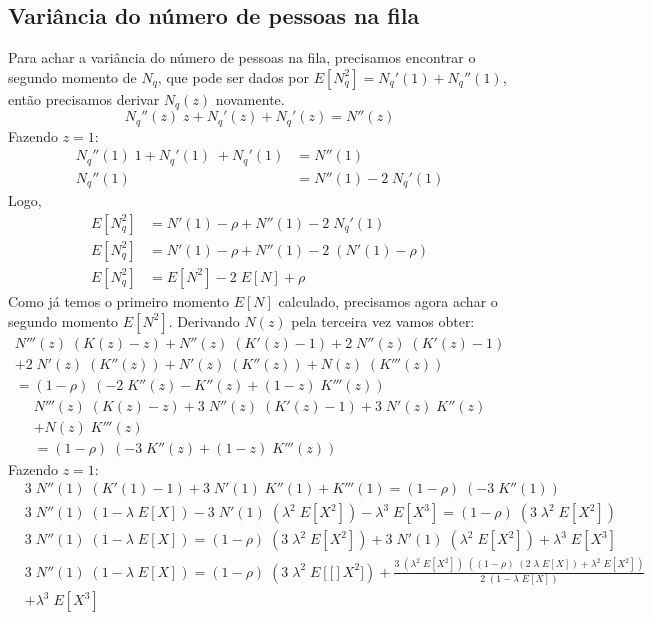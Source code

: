 \documentclass[a4paper]{article}
\newcommand{\E}[1]{E\!\left[#1\right]}
\begin{document}
\subsection{Variância do número de pessoas na fila}
Para achar a variância do número de pessoas na fila,
precisamos encontrar o segundo momento de \(N_q\),
que pode ser dados por \(E[N_q^2] = N_q'(1) + N_q''(1)\),
então precisamos derivar \(N_q(z)\) novamente.
\[
    N_q''(z) \; z + N_q'(z) + N_q'(z) = N''(z)
\]
Fazendo \(z = 1\):
\begin{align*}
    N_q''(1) \; 1 + N_q'(1) \; + N_q'(1) &= N''(1) \\
    N_q''(1) &= N''(1) - 2 \; N_q'(1)
\end{align*}
Logo,
\begin{align*}
    \E{N_q^2} &= N'(1) - \rho + N''(1) - 2 \; N_q'(1) \\
    \E{N_q^2} &= N'(1) - \rho + N''(1) - 2 \; (N'(1) - \rho) \\
    \E{N_q^2} &= \E{N^2} - 2 \; \E{N} + \rho
\end{align*}
Como já temos o primeiro momento \(\E{N}\) calculado,
precisamos agora achar o segundo momento \(\E{N^2}\).
Derivando \(N(z)\) pela terceira vez vamos obter:
\begin{align*}
    N'''(z) \; (K(z) - z) + N''(z) \; (K'(z) - 1)
        + 2 \; N''(z) \; (K'(z) - 1) \\
        + 2 \; N'(z) \; (K''(z)) + N'(z) \; (K''(z))
        + N(z) \; (K'''(z)) \\
        = (1 - \rho) \; (-2 \; K''(z) - K''(z)
        + (1 - z) \; K'''(z))
\end{align*} \begin{align*}
    N'''(z) \; (K(z) - z) + 3 \; N''(z) \; (K'(z) - 1)
        + 3 \; N'(z) \; K''(z) \\
        + N(z) \; K'''(z) \\
        = (1 - \rho) \; (-3 \; K''(z) + (1 - z) \; K'''(z))
\end{align*}
Fazendo \(z = 1\):
\begin{align*}
    &3 \; N''(1) \; (K'(1) - 1)
        + 3 \; N'(1) \; K''(1) + K'''(1)
        = (1 - \rho) \; (-3 \; K''(1)) \\
    &3 \; N''(1) \; (1 - \lambda \; \E{X})
        - 3 \; N'(1) \; (\lambda^2 \; \E{X^2})
        - \lambda^3 \; \E{X^3}
        = (1 - \rho) \; (3 \; \lambda^2 \; \E{X^2}) \\
    &3 \; N''(1) \; (1 - \lambda \; \E{X})
        = (1 - \rho) \; (3 \; \lambda^2 \; \E{X^2})
        + 3 \; N'(1) \; (\lambda^2 \; \E{X^2})
        + \lambda^3 \; \E{X^3} \\
    &3 \; N''(1) \; (1 - \lambda \; \E{X})
        = (1 - \rho) \; (3 \; \lambda^2 \; \E[X^2])
        + \frac{3 \; (\lambda^2 \; \E{X^2}) \;
        ((1 - \rho) \; (2 \; \lambda \; \E{X})
        + \lambda^2 \; \E{X^2})}{2 \; (1 - \lambda \; \E{X})}\\
        &+ \lambda^3 \; \E{X^3} \\
\end{align*}
\end{document}
